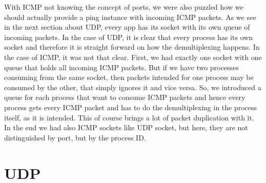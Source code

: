 With ICMP not knowing the concept of ports, we were also puzzled how we should
actually provide a ping instance with incoming ICMP packets. As we see in the
next section about UDP, every app has its socket with its own queue of incoming
packets. In the case of UDP, it is clear that every process has its own socket
and therefore it is straight forward on how the demultiplexing happens. In the
case of ICMP, it was not that clear. First, we had exactly one socket with one
queue that holds all incoming ICMP packets. But if we have two processes
consuming from the same socket, then packets intended for one process may be
consumed by the other, that simply ignores it and vice versa. So, we introduced
a queue for each process that want to consume ICMP packets and hence every
process gets every ICMP packet and has to do the demultiplexing in the process
itself, as it is intended. This of course brings a lot of packet duplication
with it. In the end we had also ICMP sockets like UDP socket, but here, they are
not distinguished by port, but by the process ID. 

\section{UDP}

